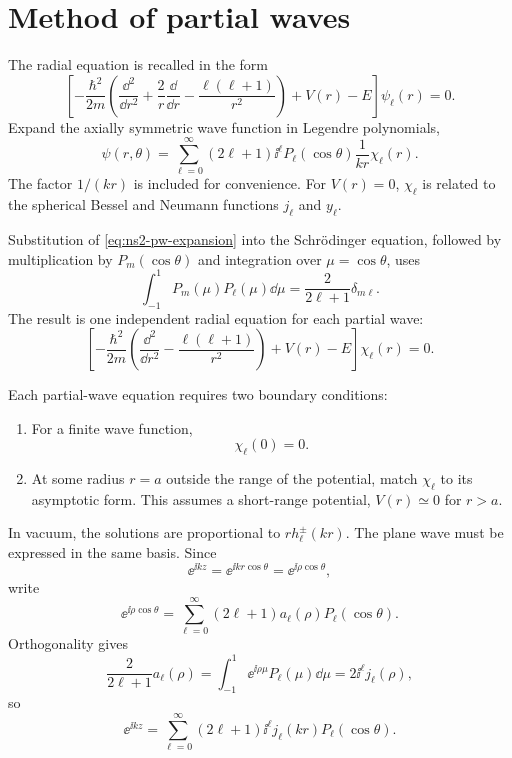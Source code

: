\section{Method of partial waves}
The radial equation is recalled in the form
\begin{equation}
  \left[-\frac{\hbar^2}{2m}
  \left(\frac{\dd^2}{\dd r^2}+\frac{2}{r}\frac{\dd}{\dd r}
  -\frac{\ell(\ell+1)}{r^2}\right)
  +V(r)-E\right]\psi_\ell(r)=0.
  \label{eq:ns2-radial-psi}
\end{equation}
Expand the axially symmetric wave function in Legendre polynomials,
\begin{equation}
  \psi(r,\theta)
  =\sum_{\ell=0}^{\infty}(2\ell+1)\ii^\ell
  P_\ell(\cos\theta)\frac{1}{kr}\chi_\ell(r).
  \label{eq:ns2-pw-expansion}
\end{equation}
The factor $1/(kr)$ is included for convenience.  For $V(r)=0$, $\chi_\ell$ is related to the spherical Bessel and Neumann functions $j_\ell$ and $y_\ell$.

Substitution of \eqref{eq:ns2-pw-expansion} into the Schr\"odinger equation, followed by multiplication by $P_m(\cos\theta)$ and integration over $\mu=\cos\theta$, uses
\[
  \int_{-1}^{1}P_m(\mu)P_\ell(\mu)\dd\mu
  =\frac{2}{2\ell+1}\delta_{m\ell}.
\]
The result is one independent radial equation for each partial wave:
\begin{equation}
  \left[-\frac{\hbar^2}{2m}
  \left(\frac{\dd^2}{\dd r^2}-\frac{\ell(\ell+1)}{r^2}\right)
  +V(r)-E\right]\chi_\ell(r)=0.
  \label{eq:ns2-chi-equation}
\end{equation}

Each partial-wave equation requires two boundary conditions:
\begin{enumerate}
  \item For a finite wave function,
  \[
    \chi_\ell(0)=0.
  \]
  \item At some radius $r=a$ outside the range of the potential, match $\chi_\ell$ to its asymptotic form.  This assumes a short-range potential, $V(r)\simeq0$ for $r>a$.
\end{enumerate}
In vacuum, the solutions are proportional to $r h_\ell^{\pm}(kr)$.  The plane wave must be expressed in the same basis.  Since
\[
  \ee^{\ii kz}=\ee^{\ii kr\cos\theta}=\ee^{\ii\rho\cos\theta},
\]
write
\[
  \ee^{\ii\rho\cos\theta}
  =\sum_{\ell=0}^{\infty}(2\ell+1)a_\ell(\rho)P_\ell(\cos\theta).
\]
Orthogonality gives
\[
  \frac{2}{2\ell+1}a_\ell(\rho)
  =\int_{-1}^{1}\ee^{\ii\rho\mu}P_\ell(\mu)\dd\mu
  =2\ii^\ell j_\ell(\rho),
\]
so
\begin{equation}
  \ee^{\ii kz}
  =\sum_{\ell=0}^{\infty}(2\ell+1)\ii^\ell
  j_\ell(kr)P_\ell(\cos\theta).
  \label{eq:ns2-plane-wave-expansion}
\end{equation}

